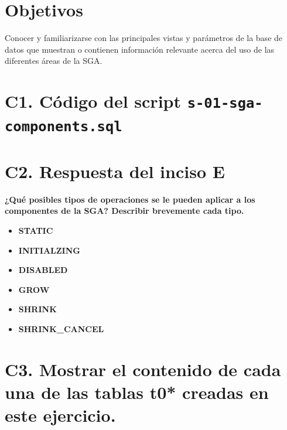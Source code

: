 \documentclass{article}
\begin{document}
\section*{Objetivos}
Conocer y familiarizarse con las principales vistas y parámetros de la base de 
datos que muestran o contienen información relevante acerca del uso
de las diferentes áreas de la SGA.

\section*{C1. Código del script \texttt{s-01-sga-components.sql}}



\section*{C2. Respuesta del inciso E}
\textbf{¿Qué posibles tipos de operaciones se le pueden aplicar 
  a los componentes de la SGA? Describir brevemente cada tipo.}

\begin{itemize}
    \item \textbf{STATIC}
    \item \textbf{INITIALZING}
    \item \textbf{DISABLED}
    \item \textbf{GROW}
    \item \textbf{SHRINK}
    \item \textbf{SHRINK\_CANCEL}
\end{itemize}

\section*{C3. Mostrar el contenido de cada una de las tablas t0* creadas en 
este ejercicio.}
\end{document}
